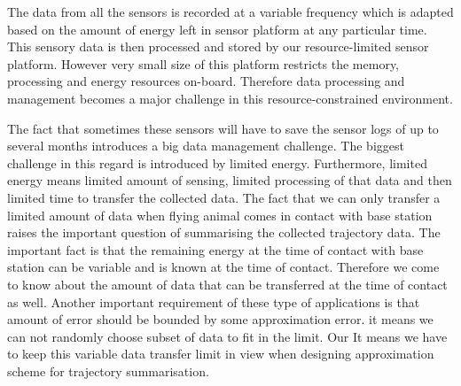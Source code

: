\documentclass[conference]{IEEEtran}
\begin{document}
 The data from all the sensors is recorded at a variable frequency which is adapted based on the amount of energy left in sensor platform at any particular time. This sensory data is then processed and stored by our resource-limited sensor platform. However very small size of this platform restricts the memory, processing and energy resources on-board. Therefore data processing and management becomes a major challenge in this resource-constrained environment. 

The fact that sometimes these sensors will have to save the sensor logs of up to several months introduces a big data management challenge. The biggest challenge in this regard is introduced by limited energy. Furthermore, limited energy means limited amount of sensing, limited processing of that data and then limited time to transfer the collected data. The fact that we can only transfer a limited amount of data when flying animal comes in contact with base station raises the important question of summarising the collected trajectory data. The important fact is that the remaining energy at the time of contact with base station can be variable and is known at the time of contact. Therefore we come to know about the amount of data that can be transferred at the time of contact as well. Another important requirement of these type of applications is that amount of error should be bounded by some approximation error. it means we can not randomly choose subset of data to fit in the limit. Our It means we have to keep this variable data transfer limit in view when designing approximation scheme for trajectory summarisation.

\end{document}
